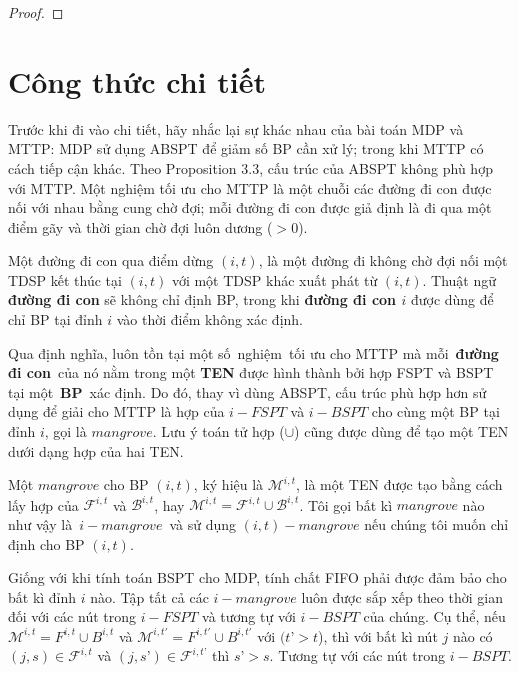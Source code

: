 \documentclass[../main.tex]{subfiles}
\begin{document}
\begin{proof} \end{proof}

\section{Công thức chi tiết}\label{cong-thuc2}

Trước khi đi vào chi tiết, hãy nhắc lại sự khác nhau của bài toán MDP và
MTTP: MDP sử dụng ABSPT để giảm số BP cần xử lý; trong khi MTTP
có cách tiếp cận khác. Theo Proposition 3.3, cấu trúc của ABSPT không
phù hợp với MTTP. Một nghiệm tối ưu cho MTTP là một chuỗi các đường đi
con được nối với nhau bằng cung chờ đợi; mỗi đường đi con được giả định
là đi qua một điểm gãy và thời gian chờ đợi luôn dương (\(>0\)).

\begin{definition}
\label{def:duong-di-con}
Một đường đi con qua điểm
dừng \((i, t)\), là một đường đi không chờ đợi nối một TDSP kết thúc tại
\((i, t)\) với một TDSP khác xuất phát từ \((i, t)\). Thuật ngữ
\textbf{đường đi con} sẽ không chỉ định BP, trong khi
\textbf{đường đi con \(i\)} được dùng để chỉ BP tại đỉnh \(i\)
vào thời điểm không xác định.
\end{definition}

Qua định nghĩa, luôn tồn tại một số~nghiệm~tối ưu cho MTTP mà
mỗi~\textbf{đường đi con}~của nó nằm trong một \textbf{TEN} được hình
thành bởi hợp FSPT và BSPT tại một~\textbf{BP}~xác định. Do đó,
thay vì dùng ABSPT, cấu trúc phù hợp hơn sử dụng để giải cho MTTP là hợp
của \(i-FSPT\) và \(i-BSPT\) cho cùng một BP tại đỉnh \(i\), gọi
là \(mangrove\). Lưu ý toán tử hợp (\(\cup\)) cũng được dùng để tạo một
TEN dưới dạng hợp của hai TEN.

\begin{definition}
\label{def:mangrove}
Một \(mangrove\) cho BP \((i, t)\), ký
hiệu là \(\mathcal M ^{i,t}\), là một TEN được tạo bằng cách lấy hợp của
\(\mathcal F^{i,t}\) và \(\mathcal B ^{i,t}\), hay
\(\mathcal M ^{i,t} = \mathcal F ^{i,t} \cup \mathcal B ^{i,t}\). Tôi gọi bất kì
\(mangrove\) nào như vậy là~\(i-mangrove\)~và sử dụng
\((i, t)-mangrove\) nếu chúng tôi muốn chỉ định cho BP
\((i, t)\).
\end{definition}

Giống với khi tính toán BSPT cho MDP, tính chất FIFO phải được đảm bảo
cho bất kì đỉnh \(i\) nào. Tập tất cả các \(i-mangrove\) luôn được sắp
xếp theo thời gian đối với các nút trong \(i-FSPT\) và tương tự với
\(i-BSPT\) của chúng. Cụ thể, nếu \(\mathcal M^{i, t}=F^{i,t}\cup B^{i,t}\)
và \(\mathcal M^{i, t'}=F^{i,t'}\cup B^{i,t'}\) với \((t’ > t\)), thì với
bất kì nút \(j\) nào có \((j,s) \in \mathcal F^{i, t}\) và
\((j,s’) \in \mathcal F^{i, t’}\) thì \(s’ > s\). Tương tự với các nút trong
\(i-BSPT\).
\end{document}
